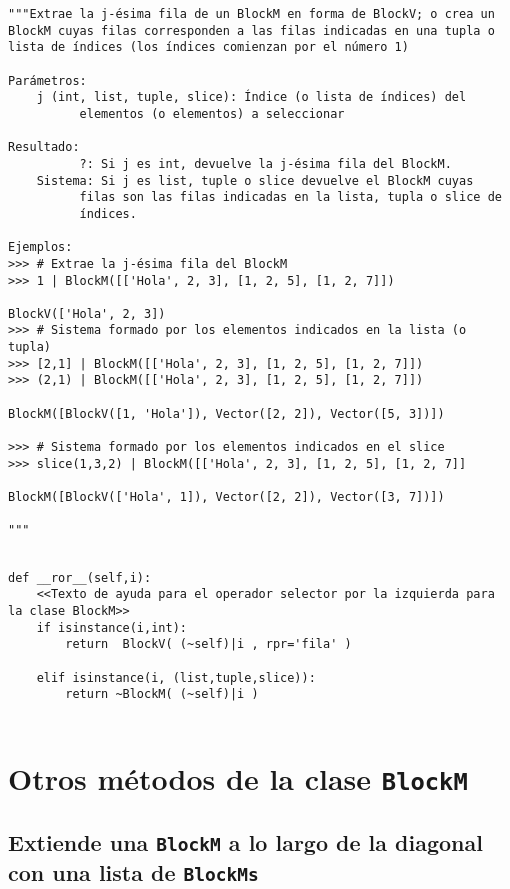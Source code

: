 \documentclass[11pt]{report}
\begin{document}
\begin{verbatim}
"""Extrae la j-ésima fila de un BlockM en forma de BlockV; o crea un
BlockM cuyas filas corresponden a las filas indicadas en una tupla o
lista de índices (los índices comienzan por el número 1)

Parámetros:
    j (int, list, tuple, slice): Índice (o lista de índices) del 
          elementos (o elementos) a seleccionar

Resultado:
          ?: Si j es int, devuelve la j-ésima fila del BlockM.
    Sistema: Si j es list, tuple o slice devuelve el BlockM cuyas
          filas son las filas indicadas en la lista, tupla o slice de
          índices.

Ejemplos:
>>> # Extrae la j-ésima fila del BlockM 
>>> 1 | BlockM([['Hola', 2, 3], [1, 2, 5], [1, 2, 7]])

BlockV(['Hola', 2, 3])
>>> # Sistema formado por los elementos indicados en la lista (o tupla)
>>> [2,1] | BlockM([['Hola', 2, 3], [1, 2, 5], [1, 2, 7]])
>>> (2,1) | BlockM([['Hola', 2, 3], [1, 2, 5], [1, 2, 7]])

BlockM([BlockV([1, 'Hola']), Vector([2, 2]), Vector([5, 3])])

>>> # Sistema formado por los elementos indicados en el slice
>>> slice(1,3,2) | BlockM([['Hola', 2, 3], [1, 2, 5], [1, 2, 7]]

BlockM([BlockV(['Hola', 1]), Vector([2, 2]), Vector([3, 7])])

"""
\end{verbatim}

\begin{verbatim}

def __ror__(self,i):
    <<Texto de ayuda para el operador selector por la izquierda para la clase BlockM>>
    if isinstance(i,int):
        return  BlockV( (~self)|i , rpr='fila' )

    elif isinstance(i, (list,tuple,slice)):        
        return ~BlockM( (~self)|i ) 
        
\end{verbatim}

\section{Otros métodos de la clase \texttt{BlockM}}
\label{sec:org9478bc4}
\subsection{Extiende una \texttt{BlockM} a lo largo de la diagonal con una lista de \texttt{BlockMs}}
\label{sec:org287374c}
\end{document}
